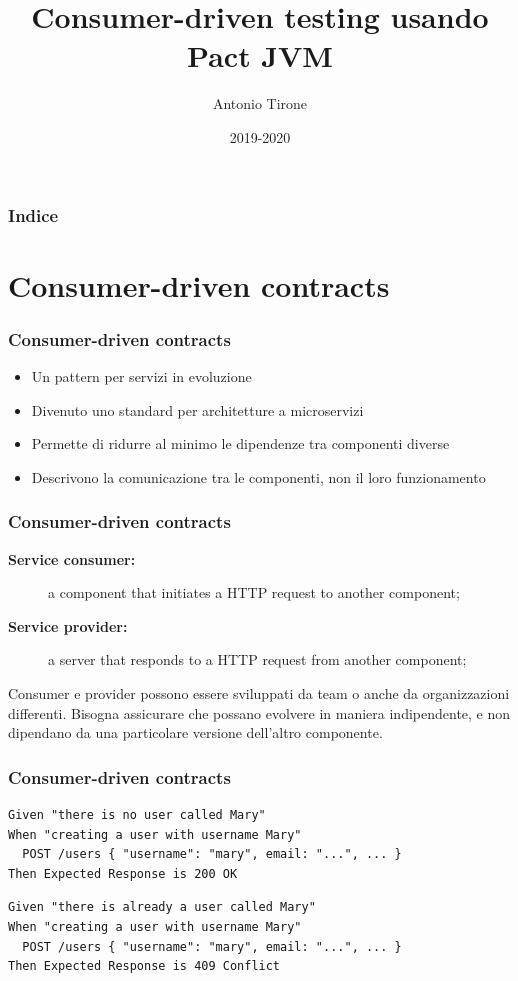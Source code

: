 \documentclass[aspectratio=169]{beamer}
\title[Pact JVM]{Consumer-driven testing usando Pact JVM}
\institute{Università degli Studi di Milano}
\author[Antonio Tirone]{Antonio Tirone}
\date{2019-2020}
\begin{document}
\frame{\titlepage}

\begin{frame}
\frametitle{Indice}
\center
\tableofcontents
\end{frame}

\section{Consumer-driven contracts}

\begin{frame}
\frametitle{Consumer-driven contracts}
\begin{itemize}
\item Un pattern per servizi in evoluzione
\item Divenuto uno standard per architetture a microservizi
\item Permette di ridurre al minimo le dipendenze tra componenti diverse
\item Descrivono la comunicazione tra le componenti, non il loro funzionamento
\end{itemize}
\end{frame}
\begin{frame}
\frametitle{Consumer-driven contracts}
\begin{description}
\item[\textbf{Service consumer:}] a component that initiates a HTTP request to another component;
\item[\textbf{Service provider:}] a server that responds to a HTTP request from another component;
\end{description}
Consumer e provider possono essere sviluppati da team o anche da organizzazioni differenti. 
Bisogna assicurare che possano evolvere in maniera indipendente, e non dipendano da una particolare versione dell'altro componente. 
\end{frame}
\begin{frame}[fragile]
\frametitle{Consumer-driven contracts}

\begin{verbatim}
Given "there is no user called Mary"
When "creating a user with username Mary"
  POST /users { "username": "mary", email: "...", ... }
Then Expected Response is 200 OK
\end{verbatim}
\vspace*{1cm}
\begin{verbatim}
Given "there is already a user called Mary"
When "creating a user with username Mary"
  POST /users { "username": "mary", email: "...", ... }
Then Expected Response is 409 Conflict
\end{verbatim}
\end{frame}
\end{document}
